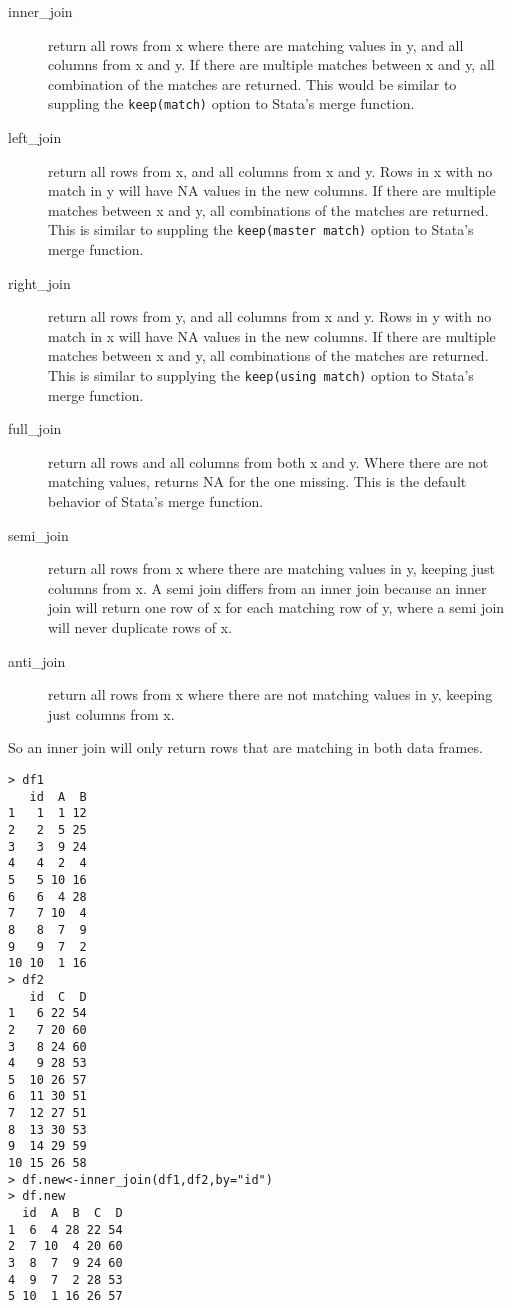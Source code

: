 \documentclass[12pt, oneside]{amsart}   	%
\begin{document}
\begin{description}
\item[inner\_join] return all rows from x where there are matching values in y, and all columns from x and y. If there are multiple matches between x and y, all combination of the matches are returned. This would be similar to suppling the \texttt{keep(match)} option to Stata's merge function.
\item[left\_join] return all rows from x, and all columns from x and y. Rows in x with no match in y will have NA values in the new columns. If there are multiple matches between x and y, all combinations of the matches are returned. This is similar to suppling the \texttt{keep(master match)} option to Stata's merge function.
\item[right\_join] return all rows from y, and all columns from x and y. Rows in y with no match in x will have NA values in the new columns. If there are multiple matches between x and y, all combinations of the matches are returned. This is similar to supplying the \texttt{keep(using match)} option to Stata's merge function.
\item[full\_join] return all rows and all columns from both x and y. Where there are not matching values, returns NA for the one missing. This is the default behavior of Stata's merge function.
\item[semi\_join] return all rows from x where there are matching values in y, keeping just columns from x. A semi join differs from an inner join because an inner join will return one row of x for each matching row of y, where a semi join will never duplicate rows of x.
\item[anti\_join] return all rows from x where there are not matching values in y, keeping just columns from x.
\end{description}

So an inner join will only return rows that are matching in both data frames.

\begin{verbatim}
> df1
   id  A  B
1   1  1 12
2   2  5 25
3   3  9 24
4   4  2  4
5   5 10 16
6   6  4 28
7   7 10  4
8   8  7  9
9   9  7  2
10 10  1 16
> df2
   id  C  D
1   6 22 54
2   7 20 60
3   8 24 60
4   9 28 53
5  10 26 57
6  11 30 51
7  12 27 51
8  13 30 53
9  14 29 59
10 15 26 58
> df.new<-inner_join(df1,df2,by="id")
> df.new
  id  A  B  C  D
1  6  4 28 22 54
2  7 10  4 20 60
3  8  7  9 24 60
4  9  7  2 28 53
5 10  1 16 26 57
\end{verbatim}
\end{document}
